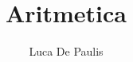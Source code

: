 \documentclass[italian,oneside,headinclude,10pt]{scrbook}
\begin{document}
\author{Luca De Paulis}
\title{Aritmetica}
\maketitle

\tableofcontents

% 
















\end{document}
